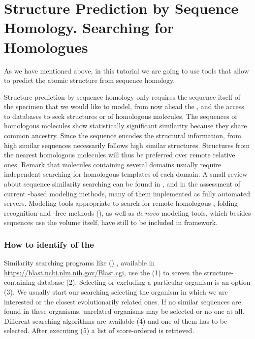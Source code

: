 \section{Structure Prediction by Sequence Homology. Searching for Homologues}
\label{sec:structurePrediction}
As we have mentioned above, in this tutorial we are going to use tools that allow to predict the atomic structure from sequence homology. 

Structure prediction by sequence homology only requires the sequence itself of the specimen that we would like to model, from now ahead the , and the access to databases to seek structures or  of homologous molecules. The sequences of homologous molecules show statistically significant similarity because they share common ancestry. Since the sequence encodes the structural information, from high similar sequences necessarily follows high similar structures. Structures from the nearest homologous molecules will thus be preferred over remote relative ones. Remark that molecules containing several domains usually require independent searching for homologous templates of each domain. A small review about sequence similarity searching can be found in \citep{pearson2013}, and in \citep{kryshtafovych2018} the assessment of current -based modeling methods, many of them implemented as fully automated servers. Modeling tools appropriate to search for remote homologous , folding recognition and -free methods (), as well as $de\ novo$ modeling tools, which besides sequences use the volume itself, have still to be included in \scipion framework. 


\subsubsection*{How to identify  of the }
 Similarity searching programs like  () \citep{altschul1997}, available in \url{https://blast.ncbi.nlm.nih.gov/Blast.cgi}, use the  (1) to screen the structure-containing database  (2). Selecting or excluding a particular organism is an option (3). We usually start our searching selecting the organism in which we are interested or the closest evolutionarily related ones. If no similar sequences are found in these organisms, unrelated organisms may be selected or no one at all. Different searching algorithms are available (4) and one of them has to be selected. After executing  (5) a list of score-ordered  is retrieved. 
 
